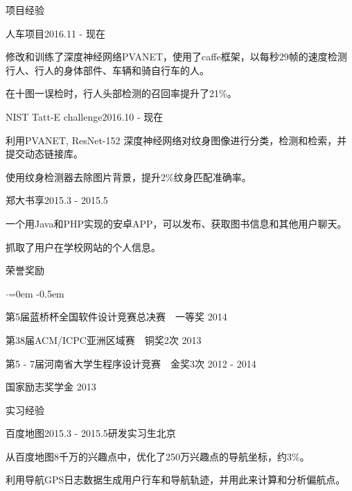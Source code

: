 \documentclass{resume} %
\begin{document}
\begin{rSection}{项目经验}


\begin{rSubsection}{人车项目}{2016.11 - 现在}{}{}
\item 修改和训练了深度神经网络PVANET，使用了caffe框架，以每秒29帧的速度检测行人、行人的身体部件、车辆和骑自行车的人。
\item 在十图一误检时，行人头部检测的召回率提升了21\%。
\end{rSubsection}

\begin{rSubsection}{NIST Tatt-E challenge}{2016.10 - 现在}{}{}
\item 利用PVANET, ResNet-152 深度神经网络对纹身图像进行分类，检测和检索，并提交动态链接库。
\item 使用纹身检测器去除图片背景，提升2\%纹身匹配准确率。
\end{rSubsection}


\begin{rSubsection}{郑大书享}{2015.3 - 2015.5}{}{}
\item 一个用Java和PHP实现的安卓APP，可以发布、获取图书信息和其他用户聊天。
\item 抓取了用户在学校网站的个人信息。
\end{rSubsection}

\end{rSection}


\begin{rSection}{荣誉奖励}
\begin{list}{$\cdot$}{\leftmargin=0em}
\itemsep -0.5em \vspace{0em}
\item 第5届蓝桥杯全国软件设计竞赛总决赛~~一等奖 \hfill{2014}
\item 第38届ACM/ICPC亚洲区域赛~~铜奖2次 \hfill {2013}
\item 第5 - 7届河南省大学生程序设计竞赛~~金奖3次 \hfill {2012 - 2014}
\item 国家励志奖学金 \hfill {2013}
\end{list}
\end{rSection}


\begin{rSection}{实习经验}
\begin{rSubsection}{百度地图}{2015.3 - 2015.5}{研发实习生}{北京}
\item 从百度地图8千万的兴趣点中，优化了250万兴趣点的导航坐标，约3\%。
\item 利用导航GPS日志数据生成用户行车和导航轨迹，并用此来计算和分析偏航点。
\end{rSubsection}
\end{rSection}
\end{document}
